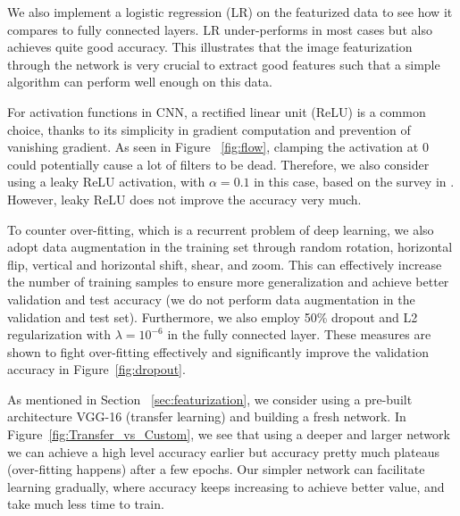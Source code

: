 \documentclass[journal, 12pt, onecolumn,draftclsnofoot]{IEEEtran}
\begin{document}
We also implement a logistic regression (LR) on the featurized data to see how it compares to fully connected layers. LR under-performs in most cases but also achieves quite good accuracy. This illustrates that the image featurization through the network is very crucial to extract good features such that a simple algorithm can perform well enough on this data. 

For activation functions in CNN, a rectified linear unit (ReLU) is a common choice, thanks to its simplicity in gradient computation and prevention of vanishing gradient. As seen in  Figure ~\ref{fig:flow}, clamping the activation at $0$ could potentially cause a lot of filters to be dead. Therefore, we also consider using a leaky ReLU activation, with  $\alpha = 0.1$ in this case, based on the survey in \cite{leaky}. However, leaky ReLU does not improve the accuracy very much. 

To counter over-fitting, which is a recurrent problem of deep learning, we also adopt data augmentation in the training set through random rotation, horizontal flip, vertical and horizontal shift, shear, and zoom. This can effectively increase the number of training samples to ensure more generalization and achieve better validation and test accuracy (we do not perform data augmentation in the validation and test set). Furthermore, we also employ 50\% dropout and L2 regularization with $\lambda = 10^{-6}$ in the fully connected layer. These measures are shown to fight over-fitting effectively and significantly improve the validation accuracy in Figure~\ref{fig:dropout}.

\begin{figure}[h]
\end{figure}

As mentioned in Section ~\ref{sec:featurization}, we consider using a pre-built architecture VGG-16 (transfer learning) and building a fresh network. In Figure~\ref{fig:Transfer_vs_Custom}, we see that using a deeper and larger network we can achieve a high level accuracy earlier but accuracy pretty much plateaus (over-fitting happens) after a few epochs. Our simpler network can facilitate learning gradually, where accuracy keeps increasing to achieve better value, and take much less time to train. 
\end{document}
